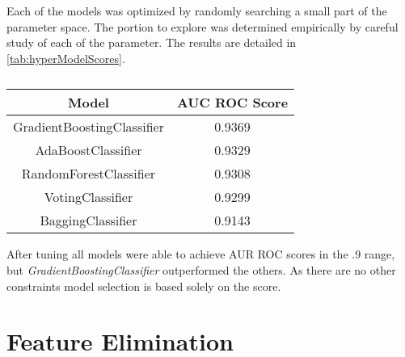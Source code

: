 Each of the models was optimized by randomly searching a small part of the
parameter space.
The portion to explore was determined empirically by careful study of
each of the parameter.
The results are detailed in \vref{tab:hyperModelScores}.

\begin{table}[!h]
    \caption{}
    \label{tab:hyperModelScores}
    \centering
    \begin{tabular}{cc}
        Model & AUC ROC Score \\
        \hline
        GradientBoostingClassifier & 0.9369 \\
        AdaBoostClassifier & 0.9329 \\
        RandomForestClassifier & 0.9308 \\
        VotingClassifier & 0.9299 \\
        BaggingClassifier & 0.9143 \\
    \end{tabular}
\end{table}

After tuning all models were able to achieve AUR ROC scores in the .9 range,
but \emph{GradientBoostingClassifier} outperformed the others.
As there are no other constraints model selection is based solely on the score.


\section{Feature Elimination}
\label{sec:featureElimination}


